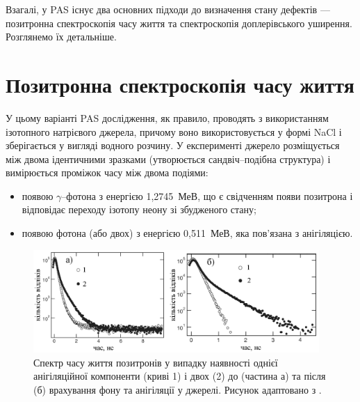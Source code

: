 \documentclass[10pt,a5paper,titlepage,oneside]{book}
\numberwithin{equation}{part}
\begin{document}
Взагалі, у PAS існує два основних підходи до визначення стану дефектів ---позитронна спектроскопія часу життя
та спектроскопія доплерівського уширення.
Розглянемо їх детальніше.

\section{Позитронна спектроскопія часу життя}\label{secPAS_PSLT}
У цьому варіанті PAS дослідження, як правило, проводять з використанням ізотопного натрієвого джерела,
причому воно використовується у формі NaCl і зберігається у вигляді водного розчину.
У експерименті джерело розміщується між двома ідентичними зразками
(утворюється сандвіч--подібна структура) і
вимірюється проміжок часу між двома подіями:
\begin{itemize}[leftmargin=0em,itemindent=1.5em]
\item появою $\gamma$--фотона з енергією 1,2745~МеВ, що є свідченням появи позитрона і відповідає переходу ізотопу неону зі збудженого стану;
\item появою фотона (або двох) з енергією 0,511~МеВ, яка пов'язана з анігіляцією.
\end{itemize}

\begin{figure}[b]
\center
\vspace{-2mm}
\includegraphics[width=0.97\textwidth]{Fig3_1}
\vspace{-3mm}
\caption{Спектр часу життя позитронів у випадку наявності однієї анігіляційної компоненти
(криві 1) і двох (2) до (частина а) та після (б) врахування фону та
анігіляції у джерелі.
Рисунок адаптовано з \cite{PAS}.}
\vspace{-3mm}
\label{F31}
\end{figure}
\end{document}
